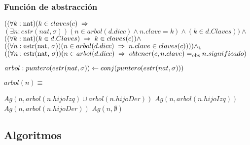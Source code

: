 \newpage
\subsubsection*{Función de abstracción}
$((\paratodo{nat}{k})( k \in claves(c) \implies $\\$(\exists n: estr(nat, \sigma))(n \in arbol(d.dicc) \land n.clave = k) \land (k \in d.Claves)) \land $\\$((\paratodo{nat}{k})(k \in d.Claves) \implies k \in claves(c)) \land $\\$ ((\paratodo{estr(nat, \sigma)}{n})(n \in arbol(d.dicc) \implies n.clave \in claves(c)))) \yluego $\\$((\paratodo{estr(nat, \sigma)}{n})(n \in arbol(d.dicc) \implies obtener(c,n.clave) \igobs n.significado)$
  
$arbol: puntero(estr(nat, \sigma)) \larr conj(puntero(estr(nat, \sigma)))$

$arbol(n) \equiv $
\begin{algorithmic}
	\State $Ag(n, arbol(n.hijoIzq) \cup arbol(n.hijoDer))$
\Else
		\State $Ag(n,arbol(n.hijoIzq))$
	\Else
		\State $Ag(n,arbol(n.hijoDer))$ 
		\Else 
		\State $Ag(n,\emptyset)$ 
		\EndIf
	\EndIf
\EndIf
\end{algorithmic}
		


\subsection{Algoritmos}




